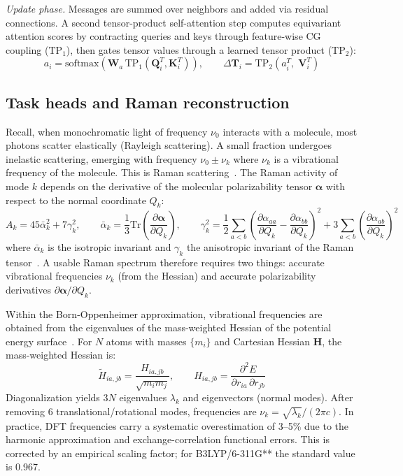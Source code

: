 \documentclass[10pt]{article}
\begin{document}
\emph{Update phase.} Messages are summed over neighbors and added via residual connections. A second tensor-product self-attention step computes equivariant attention scores by contracting queries and keys through feature-wise CG coupling ($\mathrm{TP}_1$), then gates tensor values through a learned tensor product ($\mathrm{TP}_2$):
\begin{equation}
    a_i = \mathrm{softmax}\!\left(\mathbf{W}_a\,\mathrm{TP}_1(\mathbf{Q}^T_i, \mathbf{K}^T_i)\right), \qquad
    \Delta\mathbf{T}_i = \mathrm{TP}_2\!\left(a_i^T,\; \mathbf{V}^T_i\right)
\end{equation}

\subsection{Task heads and Raman reconstruction}

Recall, when monochromatic light of frequency $\nu_0$ interacts with a molecule, most photons scatter elastically (Rayleigh scattering). A small fraction undergoes inelastic scattering, emerging with frequency $\nu_0 \pm \nu_k$ where $\nu_k$ is a vibrational frequency of the molecule. This is Raman scattering~\citep{long2002raman}. The Raman activity of mode $k$ depends on the derivative of the molecular polarizability tensor $\bm{\alpha}$ with respect to the normal coordinate $Q_k$:
\begin{equation}
    A_k = 45\bar{\alpha}_k^2 + 7\gamma_k^2, \qquad
    \bar{\alpha}_k = \frac{1}{3}\mathrm{Tr}\left(\frac{\partial\bm{\alpha}}{\partial Q_k}\right), \qquad
    \gamma_k^2 = \frac{1}{2}\sum_{a<b}\left(\frac{\partial\alpha_{aa}}{\partial Q_k} - \frac{\partial\alpha_{bb}}{\partial Q_k}\right)^2 + 3\sum_{a<b}\left(\frac{\partial\alpha_{ab}}{\partial Q_k}\right)^2
    \label{eq:raman-activity}
\end{equation}
where $\bar{\alpha}_k$ is the isotropic invariant and $\gamma_k$ the anisotropic invariant of the Raman tensor~\citep{long2002raman,Porezag_1996}. A usable Raman spectrum therefore requires two things: accurate vibrational frequencies $\nu_k$ (from the Hessian) and accurate polarizability derivatives $\partial\bm{\alpha}/\partial Q_k$.

Within the Born-Oppenheimer approximation, vibrational frequencies are obtained from the eigenvalues of the mass-weighted Hessian of the potential energy surface~\citep{wilson1955molecular}. For $N$ atoms with masses $\{m_i\}$ and Cartesian Hessian $\mathbf{H}$, the mass-weighted Hessian is:
\begin{equation}
    \tilde{H}_{ia,jb} = \frac{H_{ia,jb}}{\sqrt{m_i m_j}}, \qquad H_{ia,jb} = \frac{\partial^2 E}{\partial r_{ia}\,\partial r_{jb}}
    \label{eq:hessian}
\end{equation}
Diagonalization yields $3N$ eigenvalues $\lambda_k$ and eigenvectors (normal modes). After removing 6 translational/rotational modes, frequencies are $\nu_k = \sqrt{\lambda_k}/(2\pi c)$. In practice, DFT frequencies carry a systematic overestimation of 3--5\% due to the harmonic approximation and exchange-correlation functional errors. This is corrected by an empirical scaling factor; for B3LYP/6-311G** the standard value is 0.967.
\end{document}
